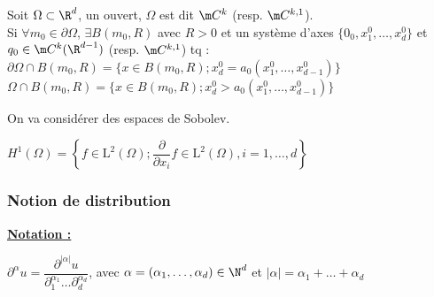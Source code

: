 \documentclass[12pt,a4paper]{article}
\begin{document}
	\begin{defi}
		Soit $\Omega \subset \R^d$, un ouvert, $\Omega$ est dit $\m C ^k$ (resp. $\m C^{k,1}$).\\
		Si $\forall m_0 \in \partial \Omega$, $\exists B(m_0,R)$ avec $R > 0$ et un système d'axes $\{0_0,x_1^0,\ldots,x_d^0\}$ et $q_0 \in \m C^k(\R^{d-1})$ (resp. $\m C^{k,1}$) tq :\\
		$\partial\Omega\cap B(m_0,R) = \{x\in B(m_0,R); x_d^0 = a_0(x_1^0,\ldots,x_{d-1}^0)\}$\\
		$\Omega\cap B(m_0,R) = \{x\in B(m_0,R); x_d^0 > a_0(x_1^0,\ldots,x_{d-1}^0)\}$
	\end{defi}
	
	On va considérer des espaces de Sobolev.
	\begin{ex}
		$H^1(\Omega) = \left\{f \in \text{L}^2(\Omega); \dfrac{\partial}{\partial x_i} f \in \text{L}^2(\Omega), i=1,\ldots,d\right\}$
	\end{ex}
	
	\newpage
	
	\subsubsection{Notion de distribution}
	
	\textbf{\underline{Notation :}} \begin{minipage}{15cm}
		$\partial^\alpha u = \dfrac{\partial^{|\alpha|}u}{\partial_1^{\alpha_1}\ldots\partial_d^{\alpha_d}}$, avec $\alpha = (\alpha_1,\ldots,\alpha_d) \in \N^d$ et $|\alpha| = \alpha_1 + \ldots + \alpha_d$
	\end{minipage}
	
\end{document}
